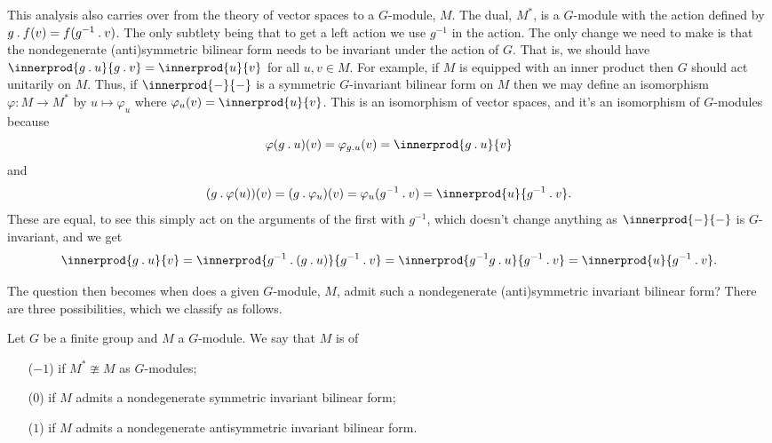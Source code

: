 This analysis also carries over from the theory of vector spaces to a \(G\)-module, \(M\).
The dual, \(M^*\), is a \(G\)-module with the action defined by \(g \mathbin{.} f(v) = f(g^{-1} \mathbin{.} v)\).
The only subtlety being that to get a left action we use \(g^{-1}\) in the action.
The only change we need to make is that the nondegenerate (anti)symmetric bilinear form needs to be invariant under the action of \(G\).
That is, we should have \(\innerprod{g \action u}{g \action v} = \innerprod{u}{v}\) for all \(u, v \in M\).
For example, if \(M\) is equipped with an inner product then \(G\) should act unitarily on \(M\).
Thus, if \(\innerprod{-}{-}\) is a symmetric \(G\)-invariant bilinear form on \(M\) then we may define an isomorphism \(\varphi \colon M \to M^*\) by \(u \mapsto \varphi_u\) where \(\varphi_u(v) = \innerprod{u}{v}\).
This is an isomorphism of vector spaces, and it's an isomorphism of \(G\)-modules because
\begin{equation}
    \varphi(g \action u)(v) = \varphi_{g \action u}(v) = \innerprod{g \action u}{v}
\end{equation}
and
\begin{equation}
    (g \action \varphi(u))(v) = (g \action \varphi_u)(v) = \varphi_u(g^{-1} \action v) = \innerprod{u}{g^{-1} \action v}.
\end{equation}
These are equal, to see this simply act on the arguments of the first with \(g^{-1}\), which doesn't change anything as \(\innerprod{-}{-}\) is \(G\)-invariant, and we get
\begin{equation}
    \innerprod{g \action u}{v} = \innerprod{g^{-1} \action (g \action u)}{g^{-1} \action v} = \innerprod{g^{-1}g \action u}{g^{-1} \action v} = \innerprod{u}{g^{-1} \action v}.
\end{equation}

The question then becomes when does a given \(G\)-module, \(M\), admit such a nondegenerate (anti)symmetric invariant bilinear form?
There are three possibilities, which we classify as follows.

\begin{dfn}{}{}
    Let \(G\) be a finite group and \(M\) a \(G\)-module.
    We say that \(M\) is of
    \begin{enumerate}
        \item[(\(-1\))]  if \(M^* \ncong M\) as \(G\)-modules;
        \item[(\(0\))]  if \(M\) admits a nondegenerate symmetric invariant bilinear form;
        \item[(\(1\))]  if \(M\) admits a nondegenerate antisymmetric invariant bilinear form.
    \end{enumerate}
\end{dfn}

